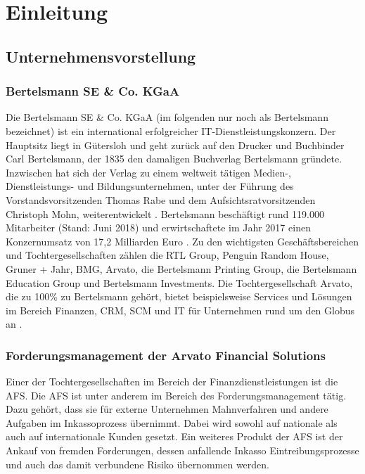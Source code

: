 \section{Einleitung}


\subsection{Unternehmensvorstellung}
\subsubsection{Bertelsmann SE \& Co. KGaA} Die Bertelsmann SE \& Co. KGaA (im folgenden nur noch als Bertelsmann bezeichnet) ist ein international erfolgreicher IT-Dienstleistungskonzern. Der Hauptsitz liegt in Gütersloh und geht zurück auf den Drucker und Buchbinder Carl Bertelsmann, der 1835 den damaligen Buchverlag Bertelsmann gründete. Inzwischen hat sich der Verlag zu einem weltweit tätigen Medien-, Dienstleistungs- und Bildungsunternehmen, unter der Führung des Vorstandsvorsitzenden Thomas Rabe und dem Aufsichtsratvorsitzenden Christoph Mohn, weiterentwickelt \citep{BertelsmannGeschaeftsbericht2016}. Bertelsmann beschäftigt rund 119.000 Mitarbeiter (Stand: Juni 2018) und erwirtschaftete im Jahr 2017 einen Konzernumsatz von 17,2 Milliarden Euro \citep{BertelsmannAufEinenBlick2018}. Zu den wichtigsten Geschäftsbereichen und Tochtergesellschaften zählen die RTL Group, Penguin Random House, Gruner + Jahr, BMG, Arvato, die Bertelsmann Printing Group, die Bertelsmann Education Group und Bertelsmann Investments. Die Tochtergesellschaft Arvato, die zu 100\% zu Bertelsmann gehört, bietet beispielsweise Services und Lösungen im Bereich Finanzen, \gls{CRM}, \gls{SCM} und IT für Unternehmen rund um den Globus an \citep{BertelsmannGeschaeftsbericht2016}.

\subsubsection{Forderungsmanagement der Arvato Financial Solutions}
Einer der Tochtergesellschaften im Bereich der Finanzdienstleistungen ist die \gls{AFS}. Die \gls{AFS} ist unter anderem im Bereich des Forderungsmanagement tätig. Dazu gehört, dass sie für externe Unternehmen Mahnverfahren und andere Aufgaben im Inkassoprozess übernimmt. Dabei wird sowohl auf nationale als auch auf internationale Kunden gesetzt. Ein weiteres Produkt der \gls{AFS} ist der Ankauf von fremden Forderungen, dessen anfallende Inkasso Eintreibungsprozesse und auch das damit verbundene Risiko übernommen werden. 

